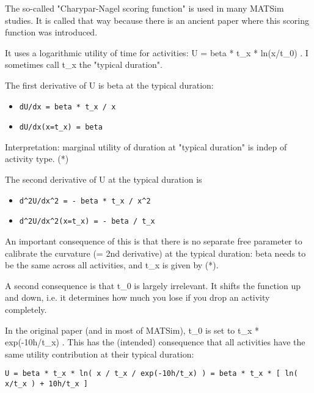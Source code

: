 \documentclass[a4paper,11pt]{report}
\begin{document}
The  so-called "Charypar-Nagel scoring function" is used in many  MATSim  studies. It is called that way because there is an ancient paper   where this scoring function was introduced.

It uses a logarithmic utility of time for activities: U = beta * t\_x *  ln(x/t\_0) . I sometimes call t\_x the "typical duration".

The first derivative of U is beta at the typical duration:
\begin{itemize}
	\item 
\begin{verbatim}
dU/dx = beta * t_x / x
\end{verbatim}
	\item 
\begin{verbatim}
dU/dx(x=t_x) = beta
\end{verbatim}
\end{itemize}

Interpretation: marginal utility of duration at "typical duration" is indep of activity type. (*)

The second derivative of U at the typical duration is
\begin{itemize}
	\item 
\begin{verbatim}
d^2U/dx^2 = - beta * t_x / x^2
\end{verbatim}
	\item 
\begin{verbatim}
d^2U/dx^2(x=t_x) = - beta / t_x
\end{verbatim}
\end{itemize}

An  important consequence of this is that there is no separate  free  parameter to calibrate the curvature (= 2nd derivative) at the  typical  duration: beta needs to be the same across all activities, and  t\_x is  given by (*).

A second consequence is that t\_0 is largely  irrelevant. It  shifts the function up and down, i.e. it determines how  much you lose  if you drop an activity completely.



In the  original paper (and in most of MATSim), t\_0 is set to t\_x *   exp(-10h/t\_x) . This has the (intended) consequence that all  activities  have the same utility contribution at their typical  duration:
\begin{verbatim}
U = beta * t_x * ln( x / t_x / exp(-10h/t_x) ) = beta * t_x * [ ln( x/t_x ) + 10h/t_x ]
\end{verbatim}
\end{document}
